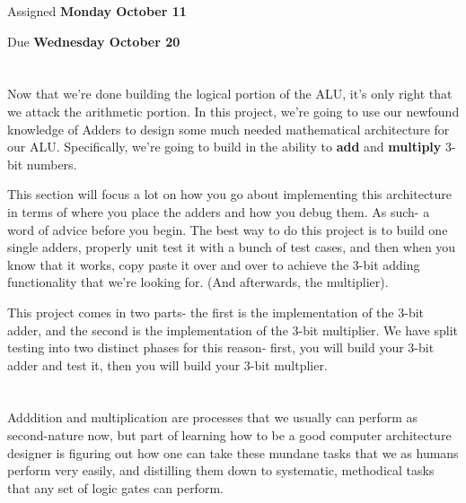 \documentclass{article}
\begin{document}
\large

{\selectfont{\Huge CMSC389E Project 2: \par Arithmetic Logic Unit- \par Adders \& Multipliers}}

Assigned \textbf{Monday October 11}

Due \textbf{Wednesday October 20}

\section{\selectfont{The Joy of Mathematics}}

Now that we're done building the logical portion of the ALU, it's only right that we attack the arithmetic portion. In this project, we're going to use our newfound knowledge of Adders to design some much needed mathematical architecture for our ALU. Specifically, we're going to build in the ability to \textbf{add} and \textbf{multiply} 3-bit numbers.

This section will focus a lot on how you go about implementing this architecture in terms of where you place the adders and how you debug them. As such- a word of advice before you begin. The best way to do this project is to build one single adders, properly unit test it with a bunch of test cases, and then when you know that it works, copy paste it over and over to achieve the 3-bit adding functionality that we're looking for. (And afterwards, the multiplier).

This project comes in two parts- the first is the implementation of the 3-bit adder, and the second is the implementation of the 3-bit multiplier.
We have split testing into two distinct phases for this reason- first, you will build your 3-bit adder and test it, then you will build your 3-bit multplier.

\section{\selectfont{Conceptual Overview: Addition and Multiplication}}

Adddition and multiplication are processes that we usually can perform as second-nature now, but part of learning how to be a good computer architecture designer is figuring out how one can take these mundane tasks that we as humans perform very easily, and distilling them down to systematic, methodical tasks that any set of logic gates can perform.
\end{document}
